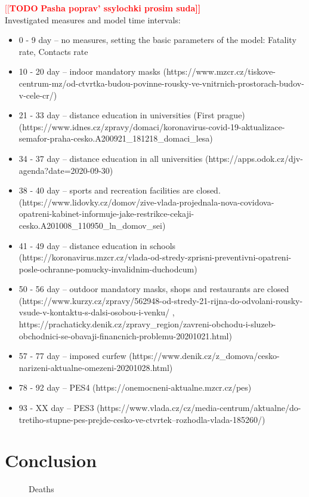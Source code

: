 \documentclass[12pt,a4paper,english]{article}
\newcommand{\todo}[1]{\noindent\textcolor{red}{[[\textbf{TODO} \textbf{#1]]}}\\}
\begin{document}
    \todo{Pasha poprav' ssylochki prosim suda}
    Investigated measures and model time intervals:
    \begin{itemize}
        \item 0 - 9   day -- no measures, setting the basic parameters of the model: Fatality rate, Contacts rate
        \item 10 - 20 day -- indoor mandatory  masks (https://www.mzcr.cz/tiskove-centrum-mz/od-ctvrtka-budou-povinne-rousky-ve-vnitrnich-prostorach-budov-v-cele-cr/)
        \item 21 - 33 day -- distance education in universities (First prague) (https://www.idnes.cz/zpravy/domaci/koronavirus-covid-19-aktualizace-semafor-praha-cesko.A200921_181218_domaci_lesa)
        \item 34 - 37 day -- distance education in all universities  (https://apps.odok.cz/djv-agenda?date=2020-09-30)
        \item 38 - 40 day -- sports and recreation facilities are closed. (https://www.lidovky.cz/domov/zive-vlada-projednala-nova-covidova-opatreni-kabinet-informuje-jake-restrikce-cekaji-cesko.A201008_110950_ln_domov_sei)
        \item 41 - 49 day -- distance education in schools (https://koronavirus.mzcr.cz/vlada-od-stredy-zprisni-preventivni-opatreni-posle-ochranne-pomucky-invalidnim-duchodcum)
        \item 50 - 56 day -- outdoor mandatory masks, shops and restaurants are closed (https://www.kurzy.cz/zpravy/562948-od-stredy-21-rijna-do-odvolani-rousky-vsude-v-kontaktu-s-dalsi-osobou-i-venku/ , https://prachaticky.denik.cz/zpravy_region/zavreni-obchodu-i-sluzeb-obchodnici-se-obavaji-financnich-problemu-20201021.html)
        \item 57 - 77 day -- imposed curfew (https://www.denik.cz/z_domova/cesko-narizeni-aktualne-omezeni-20201028.html)
        \item 78 - 92 day -- PES4 (https://onemocneni-aktualne.mzcr.cz/pes)
        \item 93 - XX day -- PES3 (https://www.vlada.cz/cz/media-centrum/aktualne/do-tretiho-stupne-pes-prejde-cesko-ve-ctvrtek--rozhodla-vlada-185260/)
    \end{itemize}
    
    \newpage
    \section{Conclusion} 
    \begin{figure}[H]
        \centering
        \hfill
        \caption{Deaths}
    \end{figure}
\end{document}
